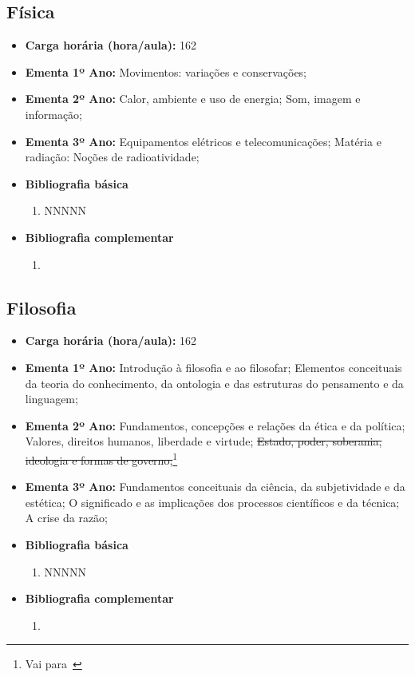 \documentclass[11pt,fleqn]{book} %
\newcommand{\VER}[1]{\begingroup\color{red}#1\endgroup}
\begin{document}
\newpage
\subsection{Física}\label{disc:fisica}
\begin{itemize}
	\item \textbf{Carga horária (hora/aula):} 162
	\item \textbf{Ementa 1º Ano:} 
	Movimentos: variações e conservações;
	\item \textbf{Ementa 2º Ano:}	
	Calor, ambiente e uso de energia;
	Som, imagem e informação;
	\item \textbf{Ementa 3º Ano:}	
	Equipamentos elétricos e telecomunicações;
	Matéria e radiação: 
	Noções de radioatividade;
	\item \textbf{Bibliografia básica}
	\begin{enumerate}
		\item NNNNN
	\end{enumerate}
	\item \textbf{Bibliografia complementar}
	\begin{enumerate}
		\item 
	\end{enumerate}	
\end{itemize}

\newpage
\subsection{Filosofia}\label{disc:filosofia}
\begin{itemize}
	\item \textbf{Carga horária (hora/aula):} 162
	\item \textbf{Ementa 1º Ano:} 
	Introdução à filosofia e ao filosofar;
	Elementos conceituais da teoria do conhecimento, da ontologia e das estruturas do pensamento e da linguagem;
	\item \textbf{Ementa 2º Ano:} 	
	Fundamentos, concepções e relações da ética e da política; 
	Valores, direitos humanos, liberdade e virtude;
	\sout{Estado, poder, soberania, ideologia e formas de governo;}\footnote{Vai para~}
	\item \textbf{Ementa 3º Ano:} 
	Fundamentos conceituais da ciência, da subjetividade e da estética;
	O significado e as implicações dos processos científicos e da técnica; 
	A crise da razão;
	\item \textbf{Bibliografia básica}
	\begin{enumerate}
		\item NNNNN
	\end{enumerate}
	\item \textbf{Bibliografia complementar}
	\begin{enumerate}
		\item 
	\end{enumerate}	
\end{itemize}
\end{document}
